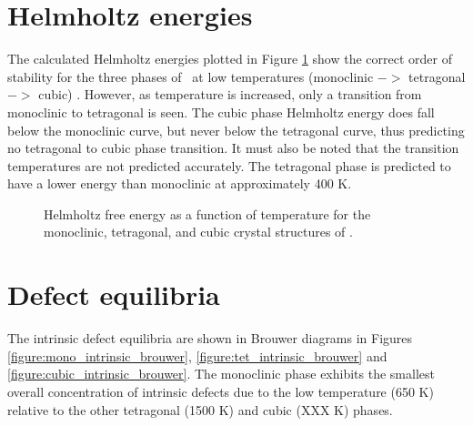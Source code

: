 \section{Helmholtz energies}

The calculated Helmholtz energies plotted in Figure \ref{Figure:helmholtz} show the correct order of stability for the three phases of \zirconia\ at low temperatures (monoclinic $->$ tetragonal $->$ cubic) . However, as temperature is increased, only a transition from monoclinic to tetragonal is seen. The cubic phase Helmholtz energy does fall below the monoclinic curve, but never below the tetragonal curve, thus predicting no tetragonal to cubic phase transition. It must also be noted that the transition temperatures are not predicted accurately. The tetragonal phase is predicted to have a lower energy than monoclinic at approximately 400 K.

\begin{figure}[ht] %
\begin{center}
		\caption{Helmholtz free energy as a function of temperature for the monoclinic, tetragonal, and cubic crystal structures of \zirconia .}
		\label{Figure:helmholtz}
	\end{center}
\end{figure}

\section{Defect equilibria}

The intrinsic defect equilibria are shown in Brouwer diagrams in Figures \ref{figure:mono_intrinsic_brouwer}, \ref{figure:tet_intrinsic_brouwer} and \ref{figure:cubic_intrinsic_brouwer}. The monoclinic phase exhibits the smallest overall concentration of intrinsic defects due to the low temperature (650 K) relative to the other tetragonal (1500 K) and cubic (XXX K) phases.

